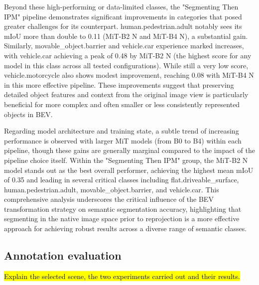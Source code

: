 Beyond these high-performing or data-limited classes, the "Segmenting Then IPM" pipeline demonstrates significant improvements in categories that posed greater challenges for its counterpart. human.pedestrian.adult notably sees its mIoU more than double to 0.11 (MiT-B2 N and MiT-B4 N), a substantial gain. Similarly, movable\_object.barrier and vehicle.car experience marked increases, with vehicle.car achieving a peak of 0.48 by MiT-B2 N (the highest score for any model in this class across all tested configurations). While still a very low score, vehicle.motorcycle also shows modest improvement, reaching 0.08 with MiT-B4 N in this more effective pipeline. These improvements suggest that preserving detailed object features and context from the original image view is particularly beneficial for more complex and often smaller or less consistently represented objects in BEV.

Regarding model architecture and training state, a subtle trend of increasing performance is observed with larger MiT models (from B0 to B4) within each pipeline, though these gains are generally marginal compared to the impact of the pipeline choice itself. Within the "Segmenting Then IPM" group, the MiT-B2 N model stands out as the best overall performer, achieving the highest mean mIoU of 0.35 and leading in several critical classes including flat.driveable\_surface, human.pedestrian.adult, movable\_object.barrier, and vehicle.car. This comprehensive analysis underscores the critical influence of the BEV transformation strategy on semantic segmentation accuracy, highlighting that segmenting in the native image space prior to reprojection is a more effective approach for achieving robust results across a diverse range of semantic classes.


\subsection{Annotation evaluation}
\hl{Explain the selected scene, the two experiments carried out and their results.}


